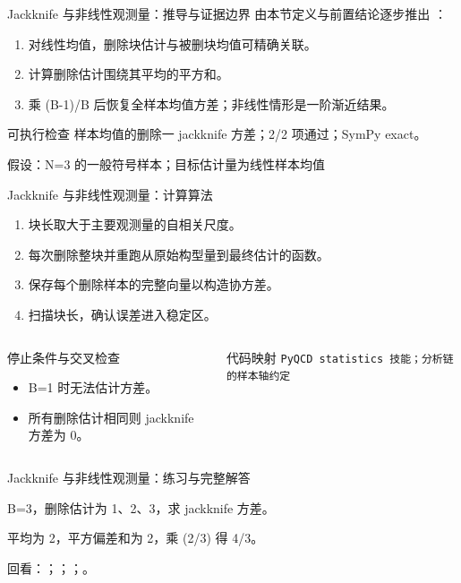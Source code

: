 \begin{frame}[t]{Jackknife 与非线性观测量：推导与证据边界}
\footnotesize
{}\quad 由本节定义与前置结论逐步推出 ：
\begin{enumerate}
\item 对线性均值，删除块估计与被删块均值可精确关联。
\item 计算删除估计围绕其平均的平方和。
\item 乘 (B-1)/\allowbreak{}B 后恢复全样本均值方差；非线性情形是一阶渐近结果。
\end{enumerate}\begin{block}{可执行检查}
\quad 样本均值的删除一 jackknife 方差；2/2 项通过；SymPy exact。
\par\scriptsize 假设：N=3 的一般符号样本；目标估计量为线性样本均值
\end{block}
\end{frame}

\begin{frame}[t]{Jackknife 与非线性观测量：计算算法}
\footnotesize
{}\begin{enumerate}
\item 块长取大于主要观测量的自相关尺度。
\item 每次删除整块并重跑从原始构型量到最终估计的函数。
\item 保存每个删除样本的完整向量以构造协方差。
\item 扫描块长，确认误差进入稳定区。
\end{enumerate}\begin{columns}[T,onlytextwidth]
\begin{block}{停止条件与交叉检查}\scriptsize\begin{itemize}
\item[\CheckMark] B=1 时无法估计方差。
\item[\CheckMark] 所有删除估计相同则 jackknife 方差为 0。
\end{itemize}\end{block}
\begin{block}{代码映射}
\scriptsize \texttt{PyQCD statistics 技能；分析链的样本轴约定}
\end{block}\end{columns}\end{frame}

\begin{frame}[t]{Jackknife 与非线性观测量：练习与完整解答}
\footnotesize
\begin{block}{}B=3，删除估计为 1、2、3，求 jackknife 方差。\end{block}
\begin{exampleblock}{}平均为 2，平方偏差和为 2，乘 (2/\allowbreak{}3) 得 4/\allowbreak{}3。\end{exampleblock}
\vfill
\scriptsize 回看：；；；。
\end{frame}

